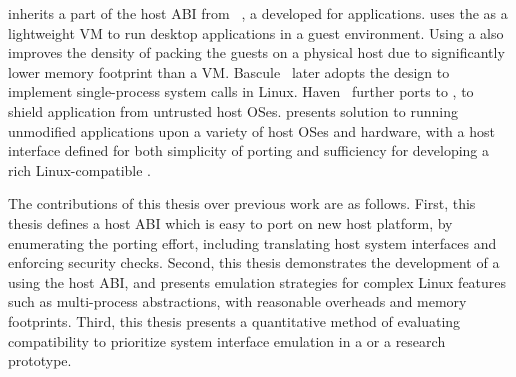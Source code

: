 \graphene{} inherits 
a part of the host ABI from \drawbridge{}~\cite{porter11drawbridge},
a \libos{} developed for %
\win{} applications.
\drawbridge{} uses the \libos{} as a lightweight VM
to run \win{} desktop applications in a guest environment.
Using a \libos{}
also improves the density of packing the guests on a physical host
due to significantly lower memory footprint than a VM.
Bascule~\cite{baumann13bascule} later adopts the design
to implement single-process system calls in Linux.
Haven~\cite{baumann14haven} further ports \drawbridge{} to \sgx{}, to shield \win{} application from untrusted host OSes.
\graphene{} %
presents solution to running unmodified applications
upon a variety of host OSes and hardware,
with a host interface defined for both simplicity of porting 
and sufficiency for developing a rich Linux-compatible \libos{}.



The contributions of this thesis over previous work
are as follows.
First, this thesis
defines a host ABI which is easy to port
on new host platform,
by enumerating the porting effort, including translating host system interfaces and enforcing security checks.
Second,
this thesis demonstrates the development
of a \libos{}
using the host ABI,
and presents emulation strategies
for complex Linux features such as multi-process abstractions,
with reasonable overheads and memory footprints.
Third,
this thesis presents a quantitative method of evaluating compatibility
to prioritize system interface emulation
in a \libos{} or a research prototype.
 

